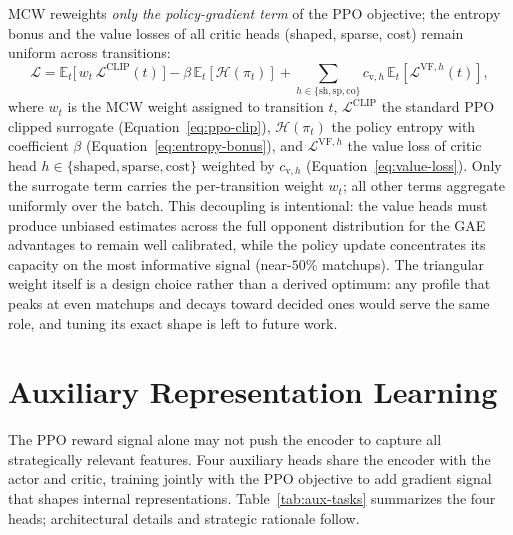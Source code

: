 MCW reweights \emph{only the policy-gradient term} of the PPO objective; the entropy bonus and the value losses of all critic heads (shaped, sparse, cost) remain uniform across transitions:
\begin{equation}
\mathcal{L} = \mathbb{E}_t\bigl[\,w_t\,\mathcal{L}^{\text{CLIP}}(t)\,\bigr]
- \beta \,\mathbb{E}_t[\mathcal{H}(\pi_t)]
+ \sum_{h \in \{\text{sh},\text{sp},\text{co}\}} c_{\text{v},h}\,\mathbb{E}_t[\mathcal{L}^{\text{VF},h}(t)],
\label{eq:ppo-with-mcw}
\end{equation}
where $w_t$ is the MCW weight assigned to transition $t$, $\mathcal{L}^{\text{CLIP}}$ the standard PPO clipped surrogate (Equation~\ref{eq:ppo-clip}), $\mathcal{H}(\pi_t)$ the policy entropy with coefficient $\beta$  (Equation~\ref{eq:entropy-bonus}), and $\mathcal{L}^{\text{VF},h}$ the value loss of critic head $h \in \{\text{shaped}, \text{sparse}, \text{cost}\}$ weighted by $c_{\text{v},h}$  (Equation~\ref{eq:value-loss}). Only the surrogate term carries the per-transition weight $w_t$; all other terms aggregate uniformly over the batch. This decoupling is intentional: the value heads must produce unbiased estimates across the full opponent distribution for the GAE advantages to remain well calibrated, while the policy update concentrates its capacity on the most informative signal (near-$50$\% matchups). The triangular weight itself is a design choice rather than a derived optimum: any profile that peaks at even matchups and decays toward decided ones would serve the same role, and tuning its exact shape is left to future work.

\section{Auxiliary Representation Learning}
\label{sec:representation}

The PPO reward signal alone may not push the encoder to capture all strategically relevant features. Four auxiliary heads share the encoder with the actor and critic, training jointly with the PPO objective to add gradient signal that shapes internal representations. Table~\ref{tab:aux-tasks} summarizes the four heads; architectural details and strategic rationale follow.

